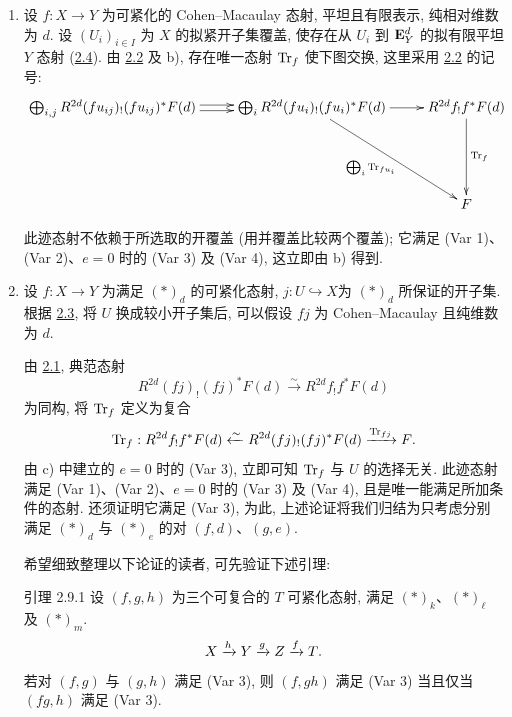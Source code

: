 \begin{enumerate}
以上面构造的态射 $t(f,u)$ 记为 $\Tr_{f}$. 由 , 此迹态射满足 (Var 1)、(Var 2)、$e=0$ 时的 (Var 3) 及 (Var 4). 只要它有定义, 就必与所求迹态射一致, 如果后者存在.

\item 设 $f:X\rightarrow Y$ 为可紧化的 Cohen--Macaulay 态射, 平坦且有限表示, 纯相对维数为 $d$. 设 $(U_{i})_{i\in I}$ 为 $X$ 的拟紧开子集覆盖, 使存在从 $U_{i}$ 到 $\mathbf{E}^{d}_{Y}$ 的拟有限平坦 $Y$ 态射 (\hyperref[XVIII.lem2.4]{2.4}). 由 \hyperref[XVIII.lem2.2]{2.2} 及 b), 存在唯一态射 $\Tr_{f}$ 使下图交换, 这里采用 \hyperref[XVIII.lem2.2]{2.2} 的记号:
$$
\xymatrix{
\bigoplus_{i,j}
R^{2d}(fu_{ij})_!(fu_{ij})^{\ast} F(d) \ar@<2pt>[r]
\ar@<-2pt>[r]&\bigoplus_{i}
R^{2d}(fu_i)_!(fu_i)^{\ast}F(d)
\ar[rdd]_{\bigoplus_{i}\Tr_{fu_i}}\ar[r]
&
R^{2d}f_!f^{\ast}F(d) \ar[dd]^{\Tr_f}\\
& & \\
& & F
}
$$

此迹态射不依赖于所选取的开覆盖 (用并覆盖比较两个覆盖); 它满足 (Var 1)、(Var 2)、$e=0$ 时的 (Var 3) 及 (Var 4), 这立即由 b) 得到.

\item 设 $f:X\rightarrow Y$ 为满足 $(\ast)_{d}$ 的可紧化态射, $j:U\hookrightarrow X$\pageoriginale 为 $(\ast)_{d}$ 所保证的开子集. 根据 \hyperref[XVIII.lem2.3]{2.3}, 将 $U$ 换成较小开子集后, 可以假设 $fj$ 为 Cohen--Macaulay 且纯维数为 $d$.

\noindent
由 \hyperref[XVIII.lem2.1]{2.1}, 典范态射
$$
R^{2d}(fj)_{!}(fj)^{\ast}F(d)\xrightarrow{\sim}
R^{2d}f_{!}f^{\ast}F(d)
$$
为同构, 将 $\Tr_{f}$ 定义为复合
$$
\operatorname{Tr}_{f}:R^{2d}f_{!}f^{\ast}F(d)\xleftarrow{\sim}
R^{2d}(fj)_{!}(fj)^{\ast}F(d)\xrightarrow{\operatorname{Tr}_{fj}}F{}.
$$
由 c) 中建立的 $e=0$ 时的 (Var 3), 立即可知 $\Tr_{f}$ 与 $U$ 的选择无关. 此迹态射满足 (Var 1)、(Var 2)、$e=0$ 时的 (Var 3) 及 (Var 4), 且是唯一能满足所加条件的态射. 还须证明它满足 (Var 3), 为此, 上述论证将我们归结为只考虑分别满足 $(\ast)_{d}$ 与 $(\ast)_{e}$ 的对 $(f,d)$、$(g,e)$.

希望细致整理以下论证的读者, 可先验证下述引理:

\begin{enonce*}{引理 2.9.1}
设 $(f,g,h)$ 为三个可复合的 $T$ 可紧化态射, 满足 $(\ast)_{k}$、$(\ast)_{\ell}$ 及 $(\ast)_{m}$.
$$
X\xrightarrow{h}Y\xrightarrow{g}Z\xrightarrow{f}T{}.
$$
若对 $(f,g)$ 与 $(g,h)$ 满足 {\rm (Var 3)}, 则 $(f,gh)$ 满足 {\rm (Var 3)} 当且仅当 $(fg,h)$ 满足 {\rm (Var 3)}.
\end{enonce*}


\end{enumerate}
